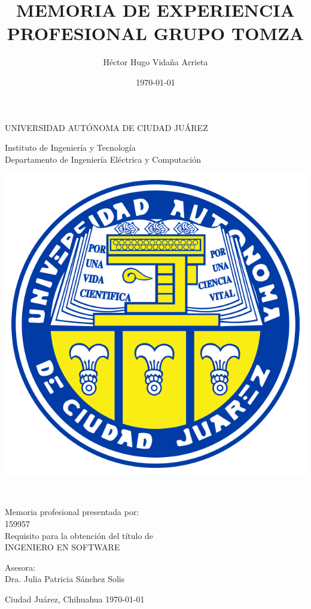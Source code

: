 \documentclass[final, fmstyle, 12pt]{article}
\title{MEMORIA DE EXPERIENCIA PROFESIONAL GRUPO TOMZA}
\author{Héctor Hugo Vidaña Arrieta}
\date{\today}
\begin{document}
\renewcommand{\tablename}{Tabla}
	\thispagestyle{empty}
\begin{center} \vfill
{\Large UNIVERSIDAD AUTÓNOMA DE CIUDAD JUÁREZ}\\
\vspace{6mm}
{\large Instituto de Ingeniería y Tecnología\\
\vspace{6mm}
Departamento de Ingeniería Eléctrica y Computación
\vspace{20mm}

\includegraphics [scale=0.7]{Imagenes/escudo-uacj} 
\vspace{10mm}


\thetitle\\
\vspace{15mm}

Memoria profesional presentada por:\\
\vspace{6mm}
\theauthor\hspace{10mm} 159957\\
\vspace{10mm}
Requisito para la obtención del título de\\
\vspace{6mm}
INGENIERO EN SOFTWARE\\
\vspace{10mm}

Asesora:\\
{Dra. Julia Patricia Sánchez Solis}\\
} \vfill
	Ciudad Juárez, Chihuahua \hspace{70mm}\today

\clearpage

\end{center}
\end{document}

